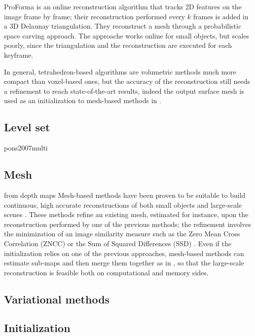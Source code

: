ProForma \cite{Pan_et_al09} is an online reconstruction algorithm that tracks 2D features on the image frame by frame; their reconstruction performed every $k$ frames is added in a 3D Delaunay triangulation. They reconstruct a mesh through a probabilistic space carving approach. The approache works online for small objects, but scales poorly, since the triangulation and the reconstruction are executed for each keyframe.

In general, tetrahedron-based algorithms are volumetric methods  much more compact than voxel-based ones, but the accuracy of the reconstruction still needs a refinement to reach state-of-the-art results, indeed the output surface mesh is used as an initialization to mesh-based methods in \cite{vu_et_al_2012,hiep2009towards,salman2010surface}.

\subsection{Level set}

pons2007multi
\subsection{Mesh}
from depth maps
\cite{turk1994zippered,pollefeys_et_al_08,akbarzadeh_et_al06,bradley2008accurate}
Mesh-based methods have been proven to be suitable to build continuous, high accurate reconstructions of both small objects and large-scale scenes \cite{hiep2009towards,vu_et_al_2012,salman2010surface,vu2011large}.
These methods refine an existing mesh, estimated for instance,  upon the reconstruction performed by one of the previous methods; the refinement involves the minimization of an image similarity measure such as the Zero Mean Cross Correlation (ZNCC) \cite{hiep2009towards,pons2007multi,zaharescu2007transformesh} or the Sum of Squared Differences (SSD) \cite{delaunoy_et_al_08,gargallo2007minimizing,delaunoy2011gradient}. 
Even if the initialization relies on one of the previous approaches, mesh-based methods can estimate sub-maps and then merge them together as in \cite{vu2011large}, so that the large-scale reconstruction is feasible both on computational and memory sides.


\subsection{Variational methods}
\subsection{Initialization}
